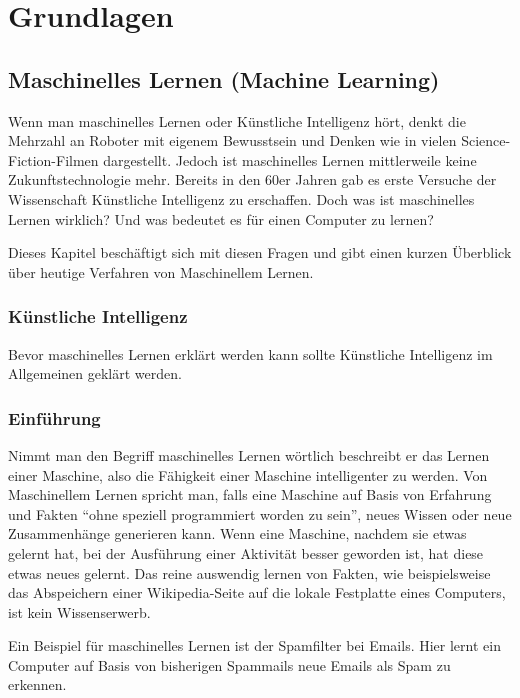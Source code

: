 \chapter{Grundlagen}

\section{Maschinelles Lernen (Machine Learning)}

    Wenn man maschinelles Lernen oder Künstliche Intelligenz hört, denkt die Mehrzahl an Roboter mit eigenem Bewusstsein und Denken wie in vielen Science-Fiction-Filmen dargestellt.
    Jedoch ist maschinelles Lernen mittlerweile keine Zukunftstechnologie mehr.
    Bereits in den 60er Jahren gab es erste Versuche der Wissenschaft Künstliche Intelligenz zu erschaffen.
    Doch was ist maschinelles Lernen wirklich? Und was bedeutet es für einen Computer zu lernen?
    \newline

    \noindent
    Dieses Kapitel beschäftigt sich mit diesen Fragen und gibt einen kurzen Überblick über heutige Verfahren von Maschinellem Lernen.

    \subsection{Künstliche Intelligenz}
    Bevor maschinelles Lernen erklärt werden kann sollte Künstliche Intelligenz im Allgemeinen geklärt werden.


    \subsection{Einführung}
    Nimmt man den Begriff maschinelles Lernen wörtlich beschreibt er das Lernen einer Maschine, also die Fähigkeit einer Maschine intelligenter zu werden.
    Von Maschinellem Lernen spricht man, falls eine Maschine auf Basis von Erfahrung und Fakten "`ohne speziell programmiert worden zu sein"'\cite[20]{HandsOnML}, neues Wissen oder neue Zusammenhänge generieren kann.
    Wenn eine Maschine, nachdem sie etwas gelernt hat, bei der Ausführung einer Aktivität besser geworden ist, hat diese etwas neues gelernt\cite[20]{HandsOnML}.
    Das reine auswendig lernen von Fakten, wie beispielsweise das Abspeichern einer Wikipedia-Seite auf die lokale Festplatte eines Computers, ist kein Wissenserwerb.
    \newline

    \noindent
    Ein Beispiel für maschinelles Lernen ist der Spamfilter bei Emails.
    Hier lernt ein Computer auf Basis von bisherigen Spammails neue Emails als Spam zu erkennen.
    \newline

